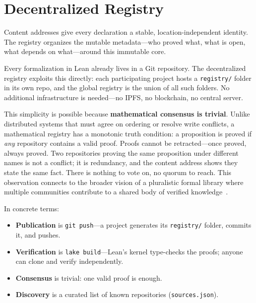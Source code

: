 \section{Decentralized Registry}
\label{sec:registry}

Content addresses give every declaration a stable,
location-independent identity.  The registry organizes the mutable
metadata---who proved what, what is open, what depends on what---around
this immutable core.

Every formalization in Lean already lives in a Git repository.  The
decentralized registry exploits this directly: each participating
project hosts a \texttt{registry/} folder in its own repo, and the
global registry is the union of all such folders.  No additional
infrastructure is needed---no IPFS, no blockchain, no central server.


This simplicity is possible because \textbf{mathematical consensus is
trivial}.  Unlike distributed systems that must agree on ordering or
resolve write conflicts, a mathematical registry has a monotonic truth
condition: a proposition is proved if \emph{any} repository contains a
valid proof.  Proofs cannot be retracted---once proved, always proved.
Two repositories proving the same proposition under different names is
not a conflict; it is redundancy, and the content address shows they
state the same fact.  There is nothing to vote on, no quorum to reach.
This observation connects to the broader vision of a pluralistic formal
library where multiple communities contribute to a shared body of
verified knowledge~\cite{kohlhase2017qed}.

In concrete terms:

\begin{itemize}[nosep]
  \item \textbf{Publication} is \texttt{git push}---a project generates
    its \texttt{registry/} folder, commits it, and pushes.
  \item \textbf{Verification} is \texttt{lake build}---Lean's kernel
    type-checks the proofs; anyone can clone and verify independently.
  \item \textbf{Consensus} is trivial: one valid proof is enough.
  \item \textbf{Discovery} is a curated list of known repositories
    (\texttt{sources.json}).
\end{itemize}

